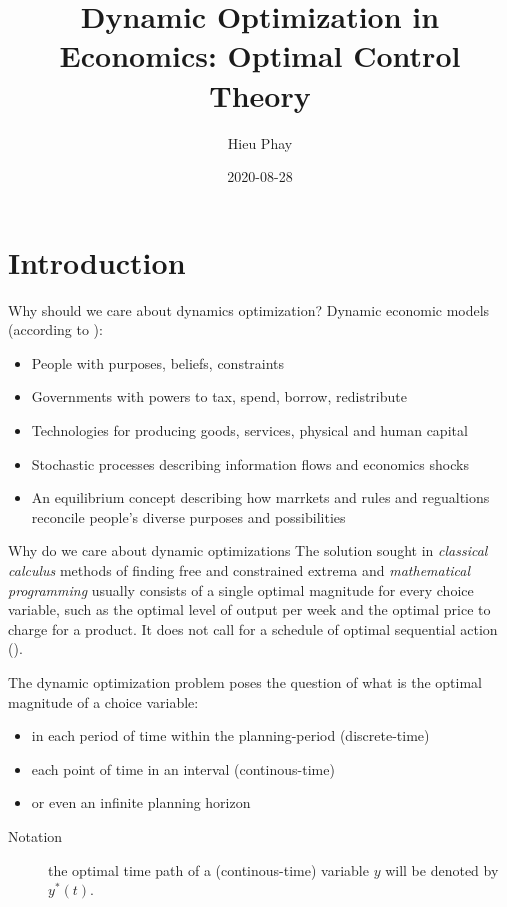 \documentclass[10pt]{beamer}
\author{Hieu Phay}
\date{2020-08-28}
\title{Dynamic Optimization in Economics: Optimal Control Theory}
\begin{document}
\maketitle

\section{Introduction}
\label{sec:org4aeda9e}
\begin{frame}[label={sec:orgc68ffd1}]{Why should we care about dynamics optimization?}
Dynamic economic models (according to \cite{sargent1987dynamic}):

\begin{itemize}
\item People with purposes, beliefs, constraints
\item Governments with powers to tax, spend, borrow, redistribute
\item Technologies for producing goods, services, physical and human capital
\item Stochastic processes describing information flows and economics shocks
\item An equilibrium concept describing how marrkets and rules and regualtions reconcile people's diverse purposes and possibilities
\end{itemize}
\end{frame}

\begin{frame}[label={sec:org063e62a}]{Why do we care about dynamic optimizations}
The solution sought in \emph{classical calculus} methods of finding free and constrained extrema and \emph{mathematical programming} usually consists of \alert{a single optimal magnitude for every choice variable}, such as the optimal level of output per week and the optimal price to charge for a product. It does not call for a \alert{schedule of optimal sequential action} (\cite{chiang2000elements}).

The dynamic optimization problem poses the question of what is the optimal magnitude of a \alert{choice variable}:
\begin{itemize}
\item in each period of time within the \alert{planning-period} (discrete-time)
\item each point of time in an \alert{interval} (continous-time)
\item or even an \alert{infinite planning horizon}
\end{itemize}

\linebreak
\begin{description}
\item[{Notation}] the optimal time path of a (continous-time) variable \(y\) will be denoted by \(y^{*}(t)\).
\end{description}
\end{frame}
\end{document}
